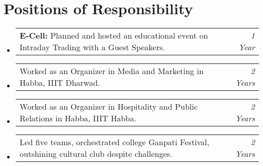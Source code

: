 \documentclass[a4paper,11pt]{article}
\makeatletter
\newcommand{\resumePOR}[3]{
\vspace{0.5mm}\item
    \begin{tabular*}{0.97\textwidth}[t]{l@{\extracolsep{\fill}}r}
        \textbf{#1}\hspace{0.3mm}#2 & \textit{\small{#3}}
    \end{tabular*}
    \vspace{-2mm}
}
\newcommand{\resumeSubHeadingListStart}{\begin{itemize}[leftmargin=*,labelsep=0mm]}
\newcommand{\resumeSubHeadingListEnd}{\end{itemize}\vspace{2mm}}
\makeatother
\begin{document}
\section{\textbf{Positions of Responsibility}}
\vspace{-0.4mm}
\resumeSubHeadingListStart
\resumePOR{    E-Cell: } %
    {Planned and hosted an educational event on Intraday Trading with a Guest Speakers.} %
    {1 Year} %
\resumePOR{} %
    { Worked as an Organizer in Media and Marketing in Habba, IIIT Dharwad.} %
    {2 Years} %
\resumePOR{} %
    { Worked as an Organizer in Hospitality and Public Relations in Habba, IIIT Habba.} %
    {2 Years} %
\resumePOR{} %
    {  Led five teams, orchestrated college Ganpati Festival, outshining cultural club despite challenges.} %
    {2 Years} %
\resumeSubHeadingListEnd
\vspace{-5mm}

\end{document}
